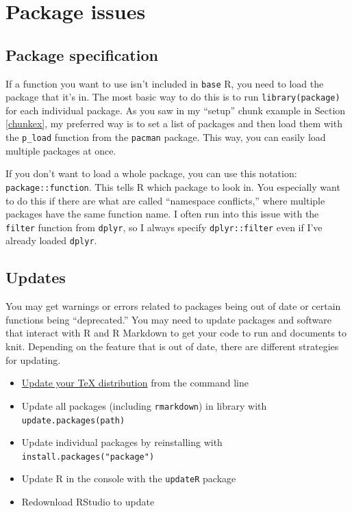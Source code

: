 \documentclass[
]{book}
\providecommand{\tightlist}{%
  \setlength{\itemsep}{0pt}\setlength{\parskip}{0pt}}
\begin{document}
\hypertarget{package-issues}{%
\section{Package issues}\label{package-issues}}

\hypertarget{package-specification}{%
\subsection{Package specification}\label{package-specification}}

If a function you want to use isn't included in \texttt{base} R, you need to load the package that it's in. The most basic way to do this is to run \texttt{library(package)} for each individual package. As you saw in my ``setup'' chunk example in Section \ref{chunkex}, my preferred way is to set a list of packages and then load them with the \texttt{p\_load} function from the \texttt{pacman} package. This way, you can easily load multiple packages at once.

If you don't want to load a whole package, you can use this notation: \texttt{package::function}. This tells R which package to look in. You especially want to do this if there are what are called ``namespace conflicts,'' where multiple packages have the same function name. I often run into this issue with the \texttt{filter} function from \texttt{dplyr}, so I always specify \texttt{dplyr::filter} even if I've already loaded \texttt{dplyr}.

\hypertarget{updates}{%
\subsection{Updates}\label{updates}}

You may get warnings or errors related to packages being out of date or certain functions being ``deprecated.'' You may need to update packages and software that interact with R and R Markdown to get your code to run and documents to knit. Depending on the feature that is out of date, there are different strategies for updating.

\begin{itemize}
\tightlist
\item
  \href{https://tex.stackexchange.com/questions/55437/how-do-i-update-my-tex-distribution}{Update your TeX distribution} from the command line
\item
  Update all packages (including \texttt{rmarkdown}) in library with \texttt{update.packages(path)}
\item
  Update individual packages by reinstalling with \texttt{install.packages("package")}
\item
  Update R in the console with the \texttt{updateR} package
\item
  Redownload RStudio to update
\end{itemize}
\end{document}
